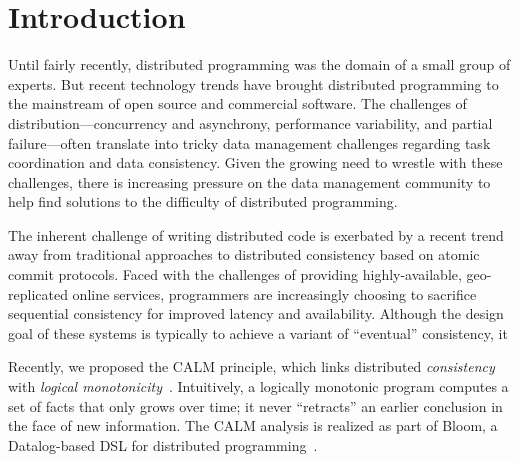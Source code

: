 \section{Introduction}
Until fairly recently, distributed programming was the domain of a small group
of experts. But recent technology trends have brought distributed programming to
the mainstream of open source and commercial software.  The challenges of
distribution---concurrency and asynchrony, performance variability, and partial
failure---often translate into tricky data management challenges regarding task
coordination and data consistency.  Given the growing need to wrestle with these
challenges, there is increasing pressure on the data management community to
help find solutions to the difficulty of distributed programming.

The inherent challenge of writing distributed code is exerbated by a recent
trend away from traditional approaches to distributed consistency based on
atomic commit protocols. Faced with the challenges of providing
highly-available, geo-replicated online services, programmers are increasingly
choosing to sacrifice sequential consistency for improved latency and
availability. Although the design goal of these systems is typically to achieve
a variant of ``eventual'' consistency, it 

Recently, we proposed the CALM principle, which links distributed
\emph{consistency} with \emph{logical
  monotonicity}~\cite{Alvaro2011}. Intuitively, a logically monotonic program
computes a set of facts that only grows over time; it never ``retracts'' an
earlier conclusion in the face of new information. The CALM analysis is realized
as part of Bloom, a Datalog-based DSL for distributed programming~\cite{bloom}.

